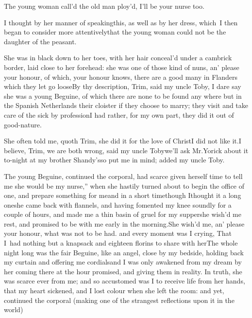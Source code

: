 \documentclass{article}
\begin{document}
The young woman call’d the old man 
ploy’d, I’ll be your nurse too.

I thought by her manner of speaking\break this, as well as by her
dress, which~I then began to consider more
attentively\break\tsk that the young woman could not be the
daughter of the peasant.

She was in black down to her toes, with her hair conceal’d
under a cambrick border, laid close to her forehead: she was one of
those kind of nuns, an’ please your honour, of which, your
honour knows, there are a good many in Flanders
which they let go loose\tsh By thy description,
Trim, said my uncle Toby, I dare say she was a young
Beguine, of which there are none to be found any where but
in the Spanish Netherlands\tsk\break
{}
their cloister if they choose to marry; they visit
and take care of the sick by profession\tsh I had rather,
for my own part, they did it out of good-nature.

\tsh She often told me, quoth Trim, she did it
for the love of Christ\tsk I did not like it.\tsh I
believe, Trim, we are both wrong, said my uncle
Toby\tsk we’ll ask Mr.\@ Yorick about it
to-night at my brother Shandy’s\tsh so put me
in mind; added my uncle Toby.

The young Beguine, continued the corporal, had scarce
given herself time to tell me \lqq she would be my nurse,”\break
when she hastily turned about to begin the office of one, and
prepare something for me\tsh and in a short
time\tsk though I\break thought it a long one\tsk she came back with
flannels, \etc \etc and having fomented my knee soundly for a
couple of hours, \etc and made me a thin basin of gruel for my
supper\tsk she wish’d me rest, and promised to be with me
early in the morning.\tsh She wish’d me, an’
please your honour, what was not to be had.
and every moment was I crying, That I~had nothing but a
knapsack and eight\-een florins to share with her\tsh The
whole night long was the fair Beguine, like an angel, close
by my bedside, holding back my curtain and offering me
cordials\tsk and I was only awakened from my dream by her coming
there at the hour promised, and giving them in
re\-ality. In truth,
she was scarce ever from me; and so accustomed was I to receive
life from her hands, that my heart sickened, and I lost colour when
she left the room: and yet, continued the corporal 
(making one of the strangest reflections upon it in
the world)\tsh
\end{document}
